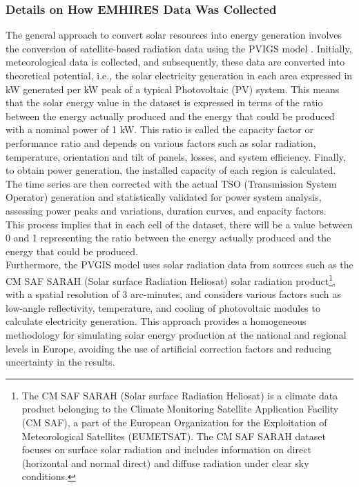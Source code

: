 \documentclass[12pt]{article}
\begin{document}
\subsubsection{Details on How EMHIRES Data Was Collected}
The general approach to convert solar resources into energy generation involves the conversion of satellite-based radiation data using the PVIGS model \cite{gonzalez-aparicio2021emhires}. Initially, meteorological data is collected, and subsequently, these data are converted into theoretical potential, i.e., the solar electricity generation in each area expressed in kW generated per kW peak of a typical Photovoltaic (PV) system. This means that the solar energy value in the dataset is expressed in terms of the ratio between the energy actually produced and the energy that could be produced with a nominal power of 1 kW. This ratio is called the capacity factor or performance ratio and depends on various factors such as solar radiation, temperature, orientation and tilt of panels, losses, and system efficiency. Finally, to obtain power generation, the installed capacity of each region is calculated. The time series are then corrected with the actual TSO (Transmission System Operator) generation and statistically validated for power system analysis, assessing power peaks and variations, duration curves, and capacity factors.
\\
This process implies that in each cell of the dataset, there will be a value between 0 and 1 representing the ratio between the energy actually produced and the energy that could be produced.
\\
Furthermore, the PVGIS model uses solar radiation data from sources such as the CM SAF SARAH (Solar surface Radiation Heliosat) solar radiation product\footnote{The CM SAF SARAH (Solar surface Radiation Heliosat) is a climate data product belonging to the Climate Monitoring Satellite Application Facility (CM SAF), a part of the European Organization for the Exploitation of Meteorological Satellites (EUMETSAT). The CM SAF SARAH dataset focuses on surface solar radiation and includes information on direct (horizontal and normal direct) and diffuse radiation under clear sky conditions.}, with a spatial resolution of 3 arc-minutes, and considers various factors such as low-angle reflectivity, temperature, and cooling of photovoltaic modules to calculate electricity generation. This approach provides a homogeneous methodology for simulating solar energy production at the national and regional levels in Europe, avoiding the use of artificial correction factors and reducing uncertainty in the results.
\end{document}
